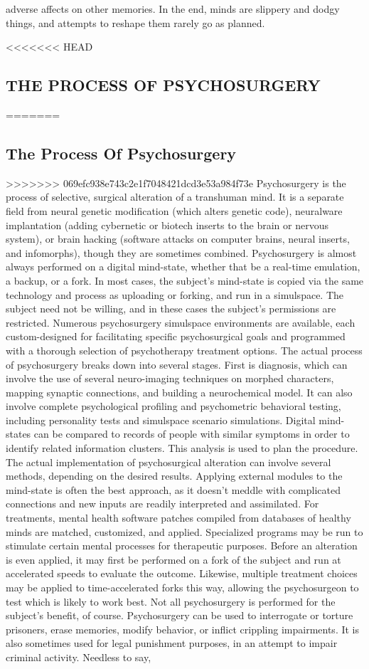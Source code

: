 adverse affects on other memories. In the end, minds are slippery and dodgy things, and attempts to reshape them rarely go as planned. 

<<<<<<< HEAD \subsection{THE PROCESS OF PSYCHOSURGERY} ======= \subsection{The Process Of Psychosurgery} >>>>>>> 069efc938e743c2e1f7048421dcd3e53a984f73e Psychosurgery is the process of selective, surgical alteration of a transhuman mind. It is a separate field from neural genetic modification (which alters genetic code), neuralware implantation (adding cybernetic or biotech inserts to the brain or nervous system), or brain hacking (software attacks on computer brains, neural inserts, and infomorphs), though they are sometimes combined. Psychosurgery is almost always performed on a digital mind-state, whether that be a real-time emulation, a backup, or a fork. In most cases, the subject’s mind-state is copied via the same technology and process as uploading or forking, and run in a simulspace. The subject need not be willing, and in these cases the subject’s permissions are restricted. Numerous psychosurgery simulspace environments are available, each custom-designed for facilitating specific psychosurgical goals and programmed with a thorough selection of psychotherapy treatment options. The actual process of psychosurgery breaks down into several stages. First is diagnosis, which can involve the use of several neuro-imaging techniques on morphed characters, mapping synaptic connections, and building a neurochemical model. It can also involve complete psychological profiling and psychometric behavioral testing, including personality tests and simulspace scenario simulations. Digital mind-states can be compared to records of people with similar symptoms in order to identify related information clusters. This analysis is used to plan the procedure. The actual implementation of psychosurgical alteration can involve several methods, depending on the desired results. Applying external modules to the mind-state is often the best approach, as it doesn’t meddle with complicated connections and new inputs are readily interpreted and assimilated. For treatments, mental health software patches compiled from databases of healthy minds are matched, customized, and applied. Specialized programs may be run to stimulate certain mental processes for therapeutic purposes. Before an alteration is even applied, it may first be performed on a fork of the subject and run at accelerated speeds to evaluate the outcome. Likewise, multiple treatment choices may be applied to time-accelerated forks this way, allowing the psychosurgeon to test which is likely to work best. Not all psychosurgery is performed for the subject’s benefit, of course. Psychosurgery can be used to interrogate or torture prisoners, erase memories, modify behavior, or inflict crippling impairments. It is also sometimes used for legal punishment purposes, in an attempt to impair criminal activity. Needless to say, 